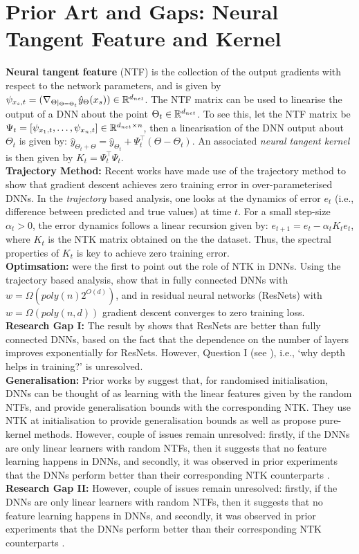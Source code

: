 \section{Prior Art and Gaps: Neural Tangent Feature and Kernel }
\textbf{Neural tangent feature} (NTF) is the collection of the output gradients with respect to the network parameters, and is given by $\psi_{x_s,t}=(\nabla_{\Theta|_{\Theta=\Theta_t}} \hat{y}_{\Theta}(x_s))\in\mathbb{R}^{d_{net}}$.  The NTF matrix can be used to linearise the output of a DNN about the point $\Theta_t\in\mathbb{R}^{d_{net}}$. To see this, let the NTF matrix be $\Psi_t=[\psi_{x_1,t},\ldots, \psi_{x_n,t}]\in\mathbb{R}^{d_{net}\times n}$, then a linearisation of the DNN output about $\Theta_t$ is given by: $\hat{y}_{\Theta_t+\Theta}=\hat{y}_{\Theta_t} + \Psi^\top_t (\Theta-\Theta_t)$. An associated \emph{neural tangent kernel} is then given by $K_t=\Psi^\top_t\Psi_t$.\\
\textbf{Trajectory Method:} Recent works have made use of the trajectory method to show that gradient descent achieves zero training error in over-parameterised DNNs. In the \emph{trajectory} based analysis, one looks at the dynamics of error $e_t$  (i.e., difference between predicted and true values) at time $t$. For a small step-size $\alpha_t>0$, the error dynamics follows a linear recursion given by: $e_{t+1}=e_t-\alpha_tK_te_t$, where $K_t$ is the NTK matrix obtained on the the dataset. Thus, the spectral properties of $K_t$ is key to achieve zero training error. \hfill\\
\textbf{Optimsation:} \cite{ntk} were the first to point out the role of NTK in DNNs. Using the trajectory based analysis, \cite{dudnn} show that in fully connected DNNs with $w=\Omega(poly(n)2^{O(d)})$, and in residual neural networks (ResNets) with $w=\Omega(poly(n,d))$ gradient descent converges to zero training loss.\\
\textbf{Research Gap I:} The result by \cite{dudnn} shows that ResNets are better than fully connected DNNs, based on the fact that the dependence on the number of layers improves exponentially for ResNets. However, Question I (see ), i.e., `why depth helps in training?' is unresolved.\\
\textbf{Generalisation:} Prior works by \cite{arora2019exact,cao2019generalization} suggest that, for randomised initialisation, DNNs can be thought of as learning with the linear features given by the random NTFs, and provide generalisation bounds with the corresponding NTK. They use NTK at initialisation to provide generalisation bounds as well as propose pure-kernel methods. However, couple of issues remain unresolved: firstly, if the DNNs are only linear learners with random NTFs, then it suggests that no feature learning happens in DNNs, and secondly, it was observed in prior experiments that the DNNs perform better than their corresponding NTK counterparts \cite{arora2019exact,lee2017deep}. \hfill\\
\textbf{Research Gap II:} However, couple of issues remain unresolved: firstly, if the DNNs are only linear learners with random NTFs, then it suggests that no feature learning happens in DNNs, and secondly, it was observed in prior experiments that the DNNs perform better than their corresponding NTK counterparts \cite{arora2019exact,lee2017deep}.
